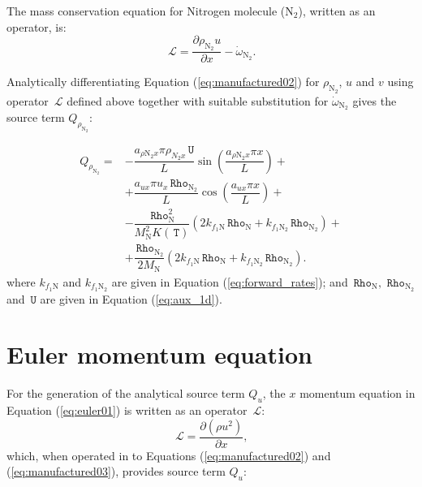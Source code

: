 \documentclass[10pt]{article}
\newcommand{\Diff}[2] {\dfrac{\partial( #1)}{\partial #2}}
\newcommand{\diff}[2] {\dfrac{\partial #1 }{\partial #2}}
\newcommand{\Lo}{\,\mathcal{L}}
\newcommand{\Rho}{\,\mathtt{Rho}}
\newcommand{\T}{\,\mathtt{T}}
\newcommand{\U}{\,\mathtt{U}}
\begin{document}
The mass conservation equation for Nitrogen molecule ($\text{N}_2$), written as an operator, is:
\begin{equation*}
 \label{eq:euler1d_11a}
\Lo =  \diff{\rho_{\text{N}_2} u }{x} - \dot{\omega}_{\text{N}_2}.
\end{equation*}

Analytically differentiating Equation (\ref{eq:manufactured02}) for $\rho_{\text{N}_2}$, $u$ and $v$ using operator $\Lo$ defined above together with suitable substitution for $\dot{\omega}_{\text{N}_2}$ gives the source term $Q_{\rho_{\text{N}_2}}$:

\begin{equation}
\begin{split}
Q_{\rho_{\text{N}_2}}=&-\dfrac{a_{ \rho \text{N}_2 x} \pi \rho_{N_2 x} \U }{L}\sin\left(\dfrac{a_{ \rho \text{N}_2 x} \pi x}{L}\right)+\\
&+\dfrac{a_{ux} \pi u_x \Rho_{\text{N}_2} }{L}\cos\left(\dfrac{a_{ux} \pi x}{L}\right)+\\
&-\dfrac{\Rho_\text{N}^2}{M_{\text{N}}^2 K(\T)} \left(2 k_{f_1 \text{N}} \Rho_\text{N}+k_{f_1 \text{N}_2} \Rho_{\text{N}_2}\right) +\\
&+\dfrac{\Rho_{\text{N}_2}}{2M_{\text{N}}}\left(2 k_{f_1 \text{N}} \Rho_\text{N}+k_{f_1 \text{N}_2} \Rho_{\text{N}_2}\right) .
\end{split}
\end{equation}
where  $k_{f_1 \text{N}}$ and $k_{f_1 \text{N}_2}$ are given in Equation (\ref{eq:forward_rates}); and $\Rho_{\text{N}},\,\Rho_{\text{N}_2}$ and $\U$ are given in Equation (\ref{eq:aux_1d}).


\section{Euler momentum equation}

For the generation of the analytical source term $Q_u$, the $x$ momentum equation in Equation (\ref{eq:euler01}) is written as an operator $\Lo$:
\begin{equation*}
 \label{eq:euler1d_12}
\Lo =\Diff{\rho u^2}{x},
\end{equation*}
which, when operated in to Equations (\ref{eq:manufactured02}) and (\ref{eq:manufactured03}), provides source term $Q_{u}$:
\end{document}
